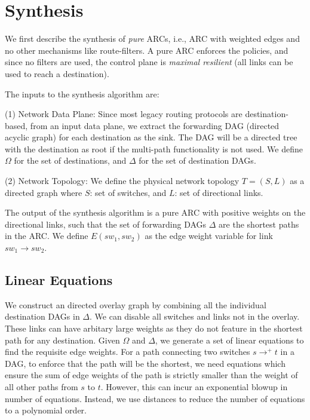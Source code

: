 \section{Synthesis}
We first describe the synthesis of {\em pure} ARCs, i.e., 
ARC with weighted edges and no other mechanisms like route-filters.
A pure ARC enforces the policies, and since no filters are used, the
control plane is {\em maximal resilient} (all links can be used 
to reach a destination). 

The inputs to the synthesis algorithm are:

(1) Network Data Plane:
Since most legacy routing protocols are destination-based,
from an input data plane, we extract the forwarding
DAG (directed acyclic graph) for each destination
as the sink. The DAG will be a directed tree with the
destination as root if the multi-path
functionality is not used. We define $\Omega$ for the 
set of destinations, and $\Delta$ for  
the set of destination DAGs. 

(2) Network Topology: 
We define the physical network topology $T = (S, L)$
as a directed graph where $S$: set of switches, and 
$L$: set of directional links. 

The output of the synthesis algorithm is a 
pure ARC with positive weights on the directional links,
such that the set of forwarding DAGs $\Delta$ are the 
shortest paths in the ARC. We define $E(sw_1, sw_2)$ as
the edge weight variable for link $sw_1 \rightarrow sw_2$. 

\subsection{Linear Equations}
We construct an directed overlay graph
by combining all the individual destination DAGs in $\Delta$.
We can disable all switches and links not in the overlay. 
These links can have arbitary large weights as they do not
feature in the shortest path for any destination. 
Given $\Omega$ and $\Delta$, we generate a set of linear equations
to find the requisite edge weights. For a path connecting two switches 
$s \rightarrow^+ t$ in a DAG, 
to enforce that the path will be the shortest, we need equations
which ensure the sum of edge weights of the path is strictly smaller than
the weight of all other paths from $s$ to $t$. However, this can incur
an exponential blowup in number of equations. Instead, we use distances 
to reduce the number of equations to a polynomial order. 

